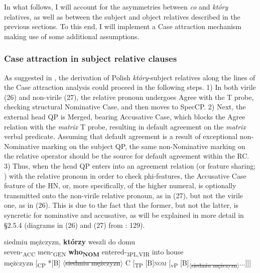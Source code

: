 \documentclass[output=paper]{langsci/langscibook}
\begin{document}
In what follows, I will account for the asymmetries between \textit{co} and \textit{który} relatives, as well as between the subject and object relatives described in the previous sections. To this end, I will implement a Case attraction mechanism making use of some additional assumptions.  

\subsubsection{Case attraction in subject relative clauses}%

As suggested in \citet{Łęska2016}, the derivation of Polish \textit{który}{}-subject relatives along the lines of the Case attraction analysis could proceed in the following steps. 1) In both virile (26) and non-virile (27), the relative pronoun undergoes Agree with the T probe, checking structural Nominative Case, and then moves to SpecCP. 2) Next, the external head QP is Merged, bearing Accusative Case, which blocks the Agree relation with the \textit{matrix} T probe, resulting in default agreement on the \textit{matrix} verbal predicate. Assuming that default agreement is a result of exceptional non-Nominative marking on the subject QP, the same non-Nominative marking on the relative operator should be the source for default agreement within the RC. 3) Thus, when the head QP enters into an agreement relation (or feature sharing; \citealt{Bader2006}) with the relative pronoun in order to check phi-features, the Accusative Case feature of the HN, or, more specifically, of the higher numeral, is optionally transmitted onto the non-virile relative pronoun, as in (27), but not the virile one, as in (26). This is due to the fact that the former, but not the latter, is syncretic for nominative and accusative, as will be explained in more detail in §2.5.4 (diagrams in (26) and (27) from \citealt{Łęska2016}: 129).

\ea%
    \label{ex:leska:26}
    \gll siedmiu   mężczyzn,   \textbf{którzy}   weszli     do   domu\\
         seven-\textsubscript{ACC}   men-\textsubscript{GEN}   \textbf{who\textsubscript{NOM}}   entered-\textsubscript{3PL,VIR} into   house \\
    \glt {} mężczyzn [\textsubscript{CP} *[B] $\langle$\st{siedmiu mężczyzn}$\rangle$ C [\textsubscript{TP} [B]{\footnotesize\textsc{nom}} [\textsubscript{vP} [B]\textsubscript{$\langle$\st{siedmiu mężczyzn}$\rangle$}...]]]
\z
\end{document}

